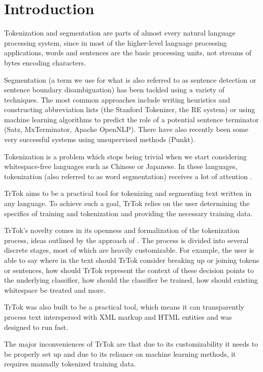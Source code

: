 \section{Introduction}
\label{sec:introduction}

Tokenization and segmentation are parts of almost every natural
language processing system, since in most of the higher-level language
processing applications, words and sentences are the basic processing
units, not streams of bytes encoding characters.

Segmentation (a term we use for what is also referred to as sentence
detection or sentence boundary disambiguation) has been tackled using
a variety of techniques. The most common approaches include writing
heuristics and constructing abbreviation lists (the Stanford
Tokenizer, the RE system) or using machine learning algorithms to
predict the role of a potential sentence terminator (Satz,
MxTerminator, Apache OpenNLP). There have also recently been some very
successful systems using unsupervised methods (Punkt).

Tokenization is a problem which stops being trivial when we start
considering whitespace-free languages such as Chinese or Japanese. In
these languages, tokenization (also referred to as word segmentation)
receives a lot of attention \cite{seg-bakeoff}.

TrTok aims to be a practical tool for tokenizing and segmenting text
written in any language. To achieve such a goal, TrTok relies on the
user determining the specifics of training and tokenization and
providing the necessary training data.

TrTok's novelty comes in its openness and formalization of the
tokenization process, ideas outlined by the approach of
\cite{sbd-trtok-orig}. The process is divided into several discrete
stages, most of which are heavily customizable. For example, the user
is able to say where in the text should TrTok consider breaking up or
joining tokens or sentences, how should TrTok represent the context of
these decision points to the underlying classifier, how should the
classifier be trained, how should existing whitespace be treated and
more.

TrTok was also built to be a practical tool, which means it can
transparently process text interspersed with XML markup and HTML
entities and was designed to run fast.

The major inconveniences of TrTok are that due to its customizability
it needs to be properly set up and due to its reliance on machine
learning methods, it requires manually tokenized training data.
